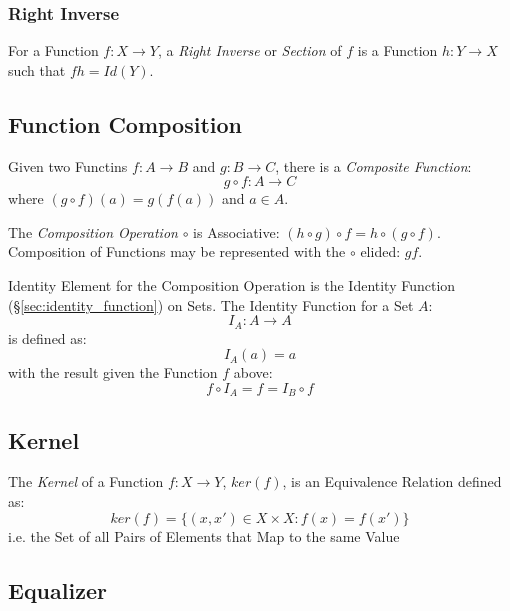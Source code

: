 \subsubsection{Right Inverse}\label{sec:right_inverse}

For a Function $f: X \rightarrow Y$, a \emph{Right Inverse} or
\emph{Section} of $f$ is a Function $h: Y \rightarrow X$ such that $fh
= Id(Y)$.



\subsection{Function Composition}\label{sec:function_composition}

Given two Functins $f : A \rightarrow B$ and $g : B \rightarrow C$,
there is a \emph{Composite Function}:
\[
  g \circ f : A \rightarrow C
\]
where $(g \circ f)(a) = g(f(a))$ and $a \in A$.

The \emph{Composition Operation} $\circ$ is Associative: $(h \circ g)
\circ f = h \circ (g \circ f)$. Composition of Functions may be
represented with the $\circ$ elided: $gf$.

Identity Element for the Composition Operation is the Identity
Function (\S\ref{sec:identity_function}) on Sets. The Identity
Function for a Set $A$:
\[
  I_A : A \rightarrow A
\]
is defined as:
\[
  I_A(a) = a
\]
with the result given the Function $f$ above:
\[
  f \circ I_A = f = I_B \circ f
\]



\subsection{Kernel}\label{sec:function_kernel}

The \emph{Kernel} of a Function $f : X \rightarrow Y$, $ker(f)$, is an
Equivalence Relation defined as:
\[
  ker(f) = \{ (x,x') \in X \times X : f(x) = f(x') \}
\]
i.e. the Set of all Pairs of Elements that Map to the same Value



\subsection{Equalizer}\label{sec:function_equalizer}

